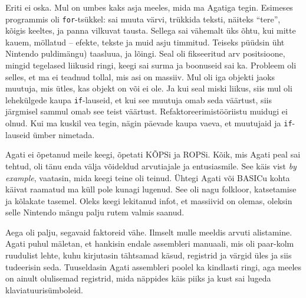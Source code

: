 Eriti ei oska. Mul on umbes kaks asja meeles, mida ma Agatiga tegin. Esimeses 
programmis oli \verb|for|-tsükkel: sai muuta värvi, trükkida 
teksti, näiteks \enquote{tere}, kõigis keeltes, ja panna vilkuvat 
tausta. Sellega sai vähemalt üks õhtu, kui mitte kauem, möllatud –
efekte, tekste ja muid asju timmitud. Teiseks püüdsin 
üht Nintendo puldimängu) taasluua, ja 
lõingi. Seal oli fikseeritud arv positsioone, mingid tegelased 
liikusid ringi, keegi sai surma ja 
boonuseid sai ka. Probleem oli selles, et ma ei teadnud tollal, mis asi 
on massiiv. Mul oli iga objekti jaoks muutuja, 
mis ütles, kas objekt on või ei ole. Ja kui seal miski liikus, siis 
mul oli lehekülgede kaupa \verb|if|-lauseid, et kui see muutuja omab seda 
väärtust, siis järgmisel sammul omab see teist väärtust. 
Refaktoreerimistööriistu muidugi ei olnud. Kui ma kuskil vea tegin, nägin 
päevade kaupa vaeva, et muutujaid ja \verb|if|-lauseid 
ümber nimetada.



Agati ei õpetanud meile keegi, õpetati 
KÕPSi ja ROPSi. Kõik, mis Agati peal sai tehtud, oli tänu enda välja 
võideldud arvutiajale ja entusiasmile. See käis vist \emph{by 
example}, vaatasin, mida keegi teine oli teinud. Ühtegi Agati või BASICu kohta 
käivat raamatud ma küll pole kunagi lugenud. See oli nagu folkloor, 
katsetamise ja kõlakate tasemel. Oleks keegi lekitanud infot, et 
massiivid on olemas, oleksin selle Nintendo mängu palju rutem valmis saanud. 


Aega oli palju, segavaid faktoreid vähe. Ilmselt mulle meeldis
arvuti alistamine. Agati puhul
mäletan, et hankisin endale 
assembleri manuaali, mis oli 
paar-kolm ruudulist lehte, kuhu kirjutasin tähtsamad käsud, registrid 
ja värgid üles ja siis tudeerisin seda. 
Tuuseldasin Agati assembleri poolel ka kindlasti ringi, aga meeles on ainult olulisemad registrid, mida näppides käis piiks 
ja kust sai lugeda klaviatuurisümboleid.

